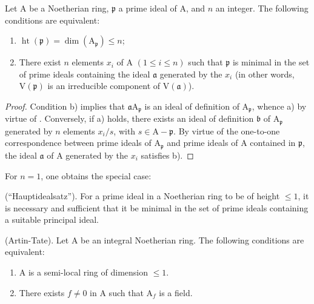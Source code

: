 \begin{proposition}[16.3.1]
\label{0.16.3.1}
Let $\mathrm{A}$ be a Noetherian ring, $\mathfrak{p}$ a prime ideal of $\mathrm{A}$, and $n$ an integer.
The following conditions are equivalent:
\begin{enumerate}
  \item[a)] $\operatorname{ht}(\mathfrak{p})=\dim(\mathrm{A}_\mathfrak{p})\leq n$;
  \item[b)] There exist $n$ elements $x_i$ of $\mathrm{A}$ $(1\leq i\leq n)$ such that $\mathfrak{p}$ is minimal in the set of prime ideals containing the ideal $\mathfrak{a}$ generated by the $x_i$ (in other words, $\mathrm{V}(\mathfrak{p})$ is an irreducible component of $\mathrm{V}(\mathfrak{a})$).
\end{enumerate}
\end{proposition}

\begin{proof}
Condition b) implies that $\mathfrak{a}\mathrm{A}_\mathfrak{p}$ is an ideal of definition of $\mathrm{A}_\mathfrak{p}$, whence a) by virtue of .
Conversely, if a) holds, there exists an ideal of definition $\mathfrak{b}$ of $\mathrm{A}_\mathfrak{p}$ generated by $n$ elements $x_i/s$, with $s\in\mathrm{A}-\mathfrak{p}$.
By virtue of the one-to-one correspondence between prime ideals of $\mathrm{A}_\mathfrak{p}$ and prime ideals of $\mathrm{A}$ contained in $\mathfrak{p}$, the ideal $\mathfrak{a}$ of $\mathrm{A}$ generated by the $x_i$ satisfies b).
\end{proof}

For $n=1$, one obtains the special case:

\begin{corollary}[16.3.2]
\label{0.16.3.2}
\textup{(``Hauptidealsatz'').}
For a prime ideal in a Noetherian ring to be of height $\leq 1$, it is necessary and sufficient that it be minimal in the set of prime ideals containing a suitable principal ideal.
\end{corollary}

\begin{corollary}[16.3.3]
\label{0.16.3.3}
\textup{(Artin-Tate).}
Let $\mathrm{A}$ be an integral Noetherian ring.
The following conditions are equivalent:
\begin{enumerate}
  \item[a)] $\mathrm{A}$ is a semi-local ring of dimension $\leq 1$.
  \item[b)] There exists $f\neq 0$ in $\mathrm{A}$ such that $\mathrm{A}_f$ is a field.
\end{enumerate}
\end{corollary}

